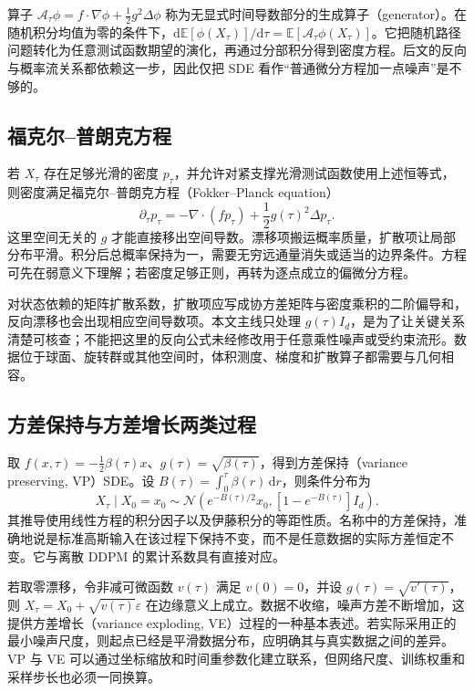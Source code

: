 \documentclass[UTF8,12pt,a4paper,fontset=fandol]{ctexart}
\begin{document}
算子 $\mathcal A_\tau\phi=f\cdot\nabla\phi+\tfrac12g^2\Delta\phi$ 称为无显式时间导数部分的生成算子（generator）。在随机积分均值为零的条件下，$\mathrm d\mathbb E[\phi(X_\tau)]/\mathrm d\tau=\mathbb E[\mathcal A_\tau\phi(X_\tau)]$。它把随机路径问题转化为任意测试函数期望的演化，再通过分部积分得到密度方程。后文的反向与概率流关系都依赖这一步，因此仅把 SDE 看作“普通微分方程加一点噪声”是不够的。

\subsection{福克尔--普朗克方程}
若 $X_\tau$ 存在足够光滑的密度 $p_\tau$，并允许对紧支撑光滑测试函数使用上述恒等式，则密度满足福克尔--普朗克方程（Fokker--Planck equation）
\begin{equation}
 \partial_\tau p_\tau=-\nabla\cdot(fp_\tau)+\frac12g(\tau)^2\Delta p_\tau.
 \label{eq:diff-fp}
\end{equation}
这里空间无关的 $g$ 才能直接移出空间导数。漂移项搬运概率质量，扩散项让局部分布平滑。积分后总概率保持为一，需要无穷远通量消失或适当的边界条件。方程可先在弱意义下理解；若密度足够正则，再转为逐点成立的偏微分方程。

对状态依赖的矩阵扩散系数，扩散项应写成协方差矩阵与密度乘积的二阶偏导和，反向漂移也会出现相应空间导数项。本文主线只处理 $g(\tau)I_d$，是为了让关键关系清楚可核查；不能把这里的反向公式未经修改用于任意乘性噪声或受约束流形。数据位于球面、旋转群或其他空间时，体积测度、梯度和扩散算子都需要与几何相容。

\subsection{方差保持与方差增长两类过程}
取 $f(x,\tau)=-\tfrac12\beta(\tau)x$、$g(\tau)=\sqrt{\beta(\tau)}$，得到方差保持（variance preserving, VP）SDE。设 $B(\tau)=\int_0^\tau\beta(r)\,\mathrm dr$，则条件分布为
\[
 X_\tau\mid X_0=x_0\sim\mathcal N(e^{-B(\tau)/2}x_0,[1-e^{-B(\tau)}]I_d).
\]
其推导使用线性方程的积分因子以及伊藤积分的等距性质。名称中的方差保持，准确地说是标准高斯输入在该过程下保持不变，而不是任意数据的实际方差恒定不变。它与离散 DDPM 的累计系数具有直接对应。

若取零漂移，令非减可微函数 $v(\tau)$ 满足 $v(0)=0$，并设 $g(\tau)=\sqrt{v'(\tau)}$，则 $X_\tau=X_0+\sqrt{v(\tau)}\varepsilon$ 在边缘意义上成立。数据不收缩，噪声方差不断增加，这提供方差增长（variance exploding, VE）过程的一种基本表述。若实际采用正的最小噪声尺度，则起点已经是平滑数据分布，应明确其与真实数据之间的差异。VP 与 VE 可以通过坐标缩放和时间重参数化建立联系，但网络尺度、训练权重和采样步长也必须一同换算。
\end{document}
